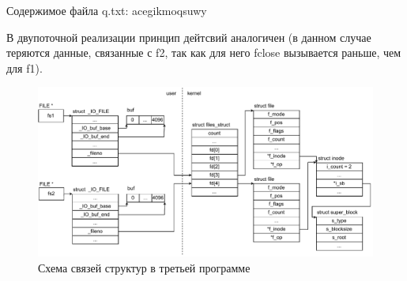 Содержимое файла q.txt: acegikmoqsuwy

В двупоточной реализации принцип дейтсвий аналогичен (в данном случае теряются данные, связанные с f2, так как для него fclose вызывается раньше, чем для f1).

\begin{figure}[H]
	\centering
	\includegraphics[scale=0.9]{inc/img/task03.pdf}
	\caption{Схема связей структур в третьей программе}
	\label{fig:prog_01_thread}
\end{figure}
